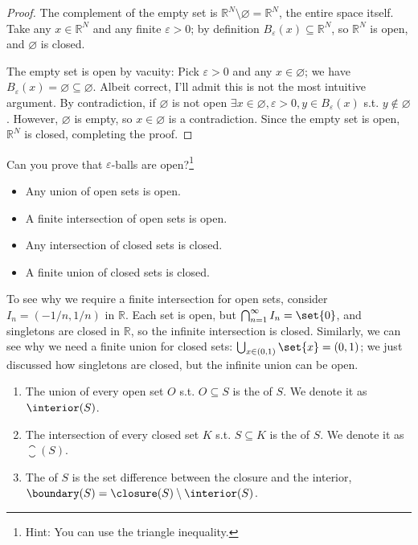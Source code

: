 \documentclass{article}
\begin{document}
\begin{proof}
  The complement of  the empty set is $\mathbb{R}^N \setminus \varnothing = \mathbb{R}^N$, the entire space itself. Take any $x \in \mathbb{R}^N$ and any finite $\varepsilon > 0$; by definition $B_{\varepsilon}(x) \subseteq \mathbb{R}^N$, so $\mathbb{R}^N$ is open, and $\varnothing$ is closed.

  The empty set is open by vacuity: Pick $\varepsilon > 0$ and any $x \in \varnothing$; we have $B_{\varepsilon}(x) = \varnothing \subseteq \varnothing$. Albeit correct, I'll admit this is not  the most intuitive argument. By contradiction, if $\varnothing$ is not open $\exists x \in \varnothing, \varepsilon > 0, y \in B_{\varepsilon}(x)$ s.t. $y \notin \varnothing$. However, $\varnothing$ is empty, so $x \in \varnothing$ is a contradiction. Since the empty set is open, $\mathbb{R}^N$ is closed, completing the proof.
\end{proof}

Can you prove that $\varepsilon$-balls are open?\footnote{Hint: You can use the triangle inequality.}
\begin{claim}
  \begin{itemize}[label=$\bullet$]
    \item Any union of open sets is open.

    \item A finite intersection of open sets is open.

    \item Any intersection of closed sets is closed.

    \item A finite union of closed sets is closed.
  \end{itemize}
\end{claim}

To see why we require a finite intersection for open sets, consider $I_n = (-1/n, 1/n)$ in $\mathbb{R}$. Each set is open, but $\bigcap^{\infty}_{n = 1} I_n = \set{0}$, and singletons are closed in $\mathbb{R}$, so the infinite intersection is closed. Similarly, we can see why we need a finite union for closed sets: $\bigcup_{x \in (0, 1)} \set{x} = (0, 1)$; we just discussed how singletons are closed, but the infinite union can be open.
\begin{definition}\label{def:lecture1_interior_closure_boundary}
  \begin{enumerate}
    \item The union of every open set $O$ s.t. $O \subseteq S$ is the  of $S$. We denote it as $\interior(S)$.

    \item The intersection of every closed set $K$ s.t. $S \subseteq K$ is the  of $S$. We denote it as $\closure(S)$.

    \item The  of $S$ is the set difference between the closure and the interior, $\boundary(S) = \closure(S) \setminus \interior(S)$.
  \end{enumerate}
\end{definition}
\end{document}
